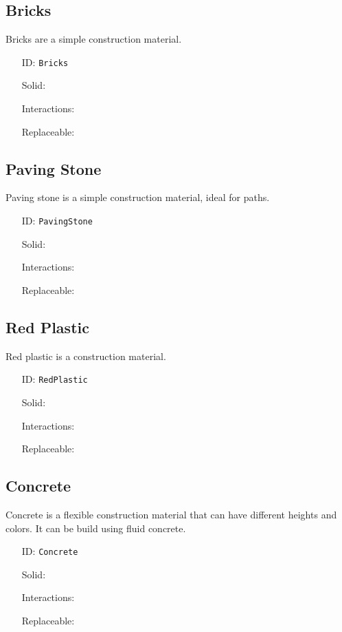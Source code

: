 \subsection{Bricks}\label{subsec:blocks_bricks}
Bricks are a simple construction material.
\newline
\begin{itemize}[nosep]
    \item[ID:] \texttt{Bricks}
    \item[Solid:]  \Checkmark \item[Interactions:]  \XSolidBrush \item[Replaceable:]  \XSolidBrush
\end{itemize}

\subsection{Paving Stone}\label{subsec:blocks_paving stone}
Paving stone is a simple construction material, ideal for paths.
\newline
\begin{itemize}[nosep]
    \item[ID:] \texttt{PavingStone}
    \item[Solid:]  \Checkmark \item[Interactions:]  \XSolidBrush \item[Replaceable:]  \XSolidBrush
\end{itemize}

\subsection{Red Plastic}\label{subsec:blocks_red plastic}
Red plastic is a construction material.
\newline
\begin{itemize}[nosep]
    \item[ID:] \texttt{RedPlastic}
    \item[Solid:]  \Checkmark \item[Interactions:]  \XSolidBrush \item[Replaceable:]  \XSolidBrush
\end{itemize}

\subsection{Concrete}\label{subsec:blocks_concrete}
Concrete is a flexible construction material that can have different heights and colors.
It can be build using fluid concrete.
\newline
\begin{itemize}[nosep]
    \item[ID:] \texttt{Concrete}
    \item[Solid:]  \Checkmark \item[Interactions:]  \Checkmark \item[Replaceable:]  \XSolidBrush
\end{itemize}


